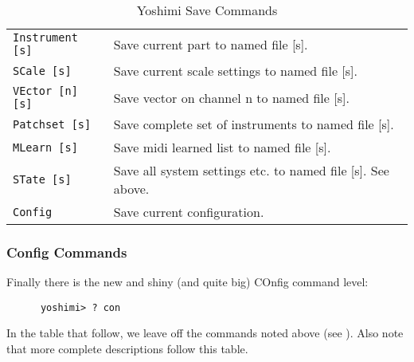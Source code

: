    \begin{table}[H]
      \centering
      \caption{Yoshimi Save Commands}
      \label{table:yoshimi_text_loadsave_commands}
      \begin{tabular}{l l}

\texttt{Instrument [s]} &
   Save current part to named file [s]. \\
\texttt{SCale [s]} &
   Save current scale settings to named file [s]. \\
\texttt{VEctor [n] [s]} &
   Save vector on channel n to named file [s]. \\
\texttt{Patchset [s]} &
   Save complete set of instruments to named file [s]. \\
\texttt{MLearn [s]} &
   Save midi learned list to named file [s]. \\
\texttt{STate [s]} &
   Save all system settings etc. to named file [s].  See above. \\
\texttt{Config} &
   Save current configuration. \\

      \end{tabular}
   \end{table}

\subsubsection{Config Commands}
\label{subsec:command_line_config_list}

   Finally there is the new and shiny (and quite big) COnfig command level:

   \begin{verbatim}
      yoshimi> ? con
   \end{verbatim}

   In the table that follow, we leave off the commands noted above
   (see ).  Also
   note that more complete descriptions follow this table.


